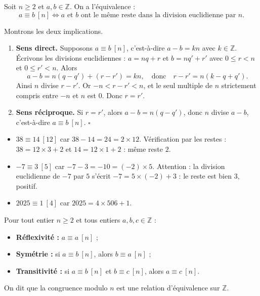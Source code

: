 \documentclass[11pt]{article}
\newcommand{\cle}[1]{{\popxbold\color{popdark}#1}}
\begin{document}
\begin{propriete}
Soit $n \geq 2$ et $a, b \in \mathbb{Z}$. On a l'équivalence :
\[ a \equiv b \ [n] \iff a \text{ et } b \text{ ont le même reste dans la division euclidienne par } n. \]
\end{propriete}

\begin{experience}
Montrons les deux implications.
\begin{enumerate}
\item \textbf{Sens direct.} Supposons $a \equiv b \ [n]$, c'est-à-dire $a - b = kn$ avec $k \in \mathbb{Z}$. Écrivons les divisions euclidiennes : $a = nq + r$ et $b = nq' + r'$ avec $0 \leq r < n$ et $0 \leq r' < n$. Alors
\[ a - b = n(q - q') + (r - r') = kn, \quad \text{donc} \quad r - r' = n(k - q + q'). \]
Ainsi $n$ divise $r - r'$. Or $-n < r - r' < n$, et le seul multiple de $n$ strictement compris entre $-n$ et $n$ est $0$. Donc $r = r'$.
\item \textbf{Sens réciproque.} Si $r = r'$, alors $a - b = n(q - q')$, donc $n$ divise $a - b$, c'est-à-dire $a \equiv b \ [n]$. \hfill $\square$
\end{enumerate}
\end{experience}

\begin{exemplebox}
\begin{itemize}
\item $38 \equiv 14 \ [12]$ car $38 - 14 = 24 = 2 \times 12$. Vérification par les restes : $38 = 12 \times 3 + 2$ et $14 = 12 \times 1 + 2$ : même reste $2$.
\item $-7 \equiv 3 \ [5]$ car $-7 - 3 = -10 = (-2) \times 5$. Attention : la division euclidienne de $-7$ par $5$ s'écrit $-7 = 5 \times (-2) + 3$ : le reste est bien $3$, positif.
\item $2025 \equiv 1 \ [4]$ car $2025 = 4 \times 506 + 1$.
\end{itemize}
\end{exemplebox}

\begin{propriete}
Pour tout entier $n \geq 2$ et tous entiers $a, b, c \in \mathbb{Z}$ :
\begin{itemize}
\item \textbf{Réflexivité :} $a \equiv a \ [n]$ ;
\item \textbf{Symétrie :} si $a \equiv b \ [n]$, alors $b \equiv a \ [n]$ ;
\item \textbf{Transitivité :} si $a \equiv b \ [n]$ et $b \equiv c \ [n]$, alors $a \equiv c \ [n]$.
\end{itemize}
On dit que la congruence modulo $n$ est une \cle{relation d'équivalence} sur $\mathbb{Z}$.
\end{propriete}
\end{document}
